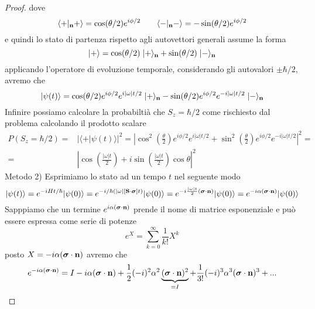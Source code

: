 \begin{proof}
dove 
\begin{equation*}
	\langle + |_{\bold{n}} + \rangle = \cos (\theta /2)e^{i \phi /2} \quad \quad \langle -|_{\bold{n}}- \rangle = - \sin(\theta /2)e^{i \phi /2}
\end{equation*}
e quindi lo stato di partenza rispetto agli autovettori generali assume la forma 
\begin{equation*}
	|+ \rangle = \cos(\theta/2) \; |+ \rangle_{\bold{n}} + \sin(\theta/2) \; |- \rangle_{\bold{n}}
\end{equation*}
applicando l'operatore di evoluzione temporale, considerando gli autovalori $\pm \hbar/2$, avremo che 
\begin{equation*}
	|\psi(t) \rangle = \cos(\theta /2) e^{i \phi/2}e^{i|\omega|t/2}\; |+\rangle_{\bold{n}} - \sin(\theta /2) e^{i \phi /2 }e^{-i|\omega|t/2}\;|- \rangle_{\bold{n}}
\end{equation*}
Infinire possiamo calcolare la probabilti\`a che $S_z = \hbar/2$ come rischiesto dal problema calcolando il prodotto scalare 
\begin{align*}
	P(S_z = \hbar /2) = & | \langle + | \psi(t)\rangle |^2 = \left | \cos^2 \left ( \frac{\theta}{2}\right ) e^{i \phi/2}e^{i|\omega|t/2}  + \sin^2 \left( \frac{\theta}{2}\right) e^{i \phi/2}e^{-i|\omega|t/2}\right|^2 = \\[0.5cm]
	= & \left | \cos \left (\frac{|\omega|t}{2} \right ) + i \sin \left( \frac{|\omega|t}{2} \right )\cos\theta\right |^2
\end{align*}
Metodo 2) 
\newline
Esprimiamo lo stato ad un tempo $t$ nel seguente modo
\begin{equation*}
	|\psi(t) \rangle = e^{-iHt/\hbar}|\psi(0) \rangle  = e^{-i/\hbar (|\omega| [\bold{S} \cdot \boldsymbol{\sigma}]t)}|\psi(0) \rangle = e^{-i \frac{|\omega|t}{2}(\boldsymbol{\sigma} \cdot \bold{n})}|\psi(0) \rangle = e^{-i \alpha (\boldsymbol{\sigma} \cdot \bold{n})}|\psi(0) \rangle
\end{equation*}
Sapppiamo che un termine $e^{i \alpha (\boldsymbol{\sigma} \cdot \bold{n})}$ prende il nome di matrice esponenziale e pu\`o essere espressa come serie di potenze 
\begin{equation*}
	e^{X} = \sum_{k=0}^{\infty} \frac{1}{k!} X^k
\end{equation*}
posto $X = -i\alpha(\boldsymbol{\sigma} \cdot \bold{n})$ avremo che 
\begin{equation*}
	e^{-i \alpha (\boldsymbol{\sigma} \cdot \bold{n})} =  I-i \alpha (\boldsymbol{\sigma} \cdot \bold{n}) + \frac{1}{2} (-i)^2 \alpha^2 \underbrace{(\boldsymbol{\sigma} \cdot \bold{n})^2}_{=I} + \frac{1}{3!}(-i)^3 \alpha^3 (\boldsymbol{\sigma} \cdot \bold{n})^3 + ...

\end{equation*}
\end{proof}
